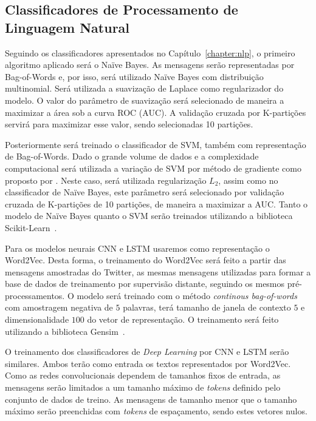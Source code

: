 \subsection{Classificadores de Processamento de Linguagem Natural}
\label{sec:nlp-classifier}

Seguindo os classificadores apresentados no Capítulo~\ref{chapter:nlp}, o
primeiro algoritmo aplicado será o Naïve Bayes.
As mensagens serão representadas por Bag-of-Words e, por isso, será utilizado
Naïve Bayes com distribuição multinomial.
Será utilizada a suavização de Laplace como regularizador do modelo.
O valor do parâmetro de suavização será selecionado de maneira a maximizar a
área sob a curva ROC (AUC).
A validação cruzada por K-partições servirá para maximizar esse valor, sendo
selecionadas 10 partições.

Posteriormente será treinado o classificador de SVM, também com representação de
Bag-of-Words.
Dado o grande volume de dados e a complexidade computacional será utilizada a
variação de SVM por método de gradiente como proposto por \citet{suykens99}.
Neste caso, será utilizada regularização $L_2$, assim como no classificador de
Naïve Bayes, este parâmetro será selecionado por validação cruzada de
K-partições de 10 partições, de maneira a maximizar a AUC.
Tanto o modelo de Naïve Bayes quanto o SVM serão treinados utilizando a
biblioteca Scikit-Learn~\cite{sklearn11}.

Para os modelos neurais CNN e LSTM usaremos como representação o Word2Vec.
Desta forma, o treinamento do Word2Vec será feito a partir das mensagens amostradas do
Twitter, as mesmas mensagens utilizadas para formar a base de dados de treinamento
por supervisão distante, seguindo os mesmos pré-processamentos.
O modelo será treinado com o método \textit{continous bag-of-words} com
amostragem negativa de $5$ palavras, terá tamanho de janela de contexto $5$ e
dimensionalidade $100$ do vetor de representação.
O treinamento será feito utilizando a biblioteca Gensim~\cite{rehurek10}.

O treinamento dos classificadores de \textit{Deep Learning} por CNN e LSTM serão
similares.
Ambos terão como entrada os textos representados por Word2Vec.
Como as redes convolucionais dependem de tamanhos fixos de entrada, as mensagens
serão limitados a um tamanho máximo de \textit{tokens} definido pelo conjunto de
dados de treino.
As mensagens de tamanho menor que o tamanho máximo serão preenchidas
com \textit{tokens} de espaçamento, sendo estes vetores nulos.

